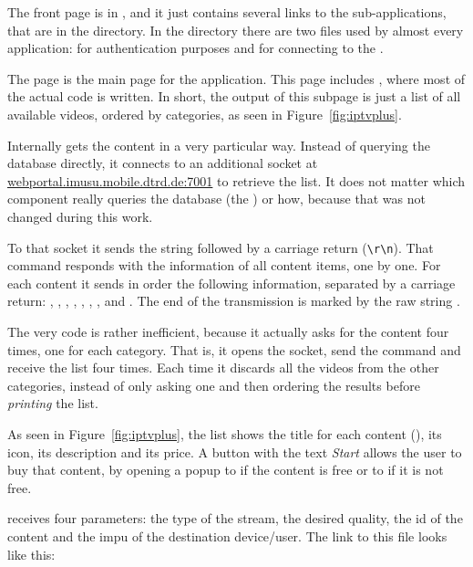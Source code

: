 The front page is in , and it just contains several links to the sub-applications, that are in the  directory.
In the  directory there are two files used by almost every application:  for authentication purposes and  for connecting to the .

The  page is the main page for the  application.
This page includes , where most of the actual code is written.
In short, the output of this subpage is just a list of all available videos, ordered by categories, as seen in Figure~\ref{fig:iptvplus}.

Internally  gets the content in a very particular way.
Instead of querying the database directly, it connects to an additional socket at \url{webportal.imusu.mobile.dtrd.de:7001} to retrieve the list.
It does not matter which component really queries the database (the ) or how, because that was not changed during this work.

To that socket it sends the string  followed by a carriage return (\texttt{\textbackslash{}r\textbackslash{}n}).
That command responds with the information of all content items, one by one.
For each content it sends in order the following information, separated by a carriage return: , , , , , , ,  and .
The end of the transmission is marked by the raw string .

The very  code is rather inefficient, because it actually asks for the content four times, one for each category.
That is, it opens the socket, send the command and receive the list four times.
Each time it discards all the videos from the other categories, instead of only asking one and then ordering the results before \emph{printing} the list.

As seen in Figure~\ref{fig:iptvplus}, the list shows the title for each content (), its icon, its description and its price.
A button with the text \emph{Start} allows the user to buy that content, by opening a popup to  if the content is free or to  if it is not free.

 receives four  parameters: the type of the stream, the desired quality, the id of the content and the impu of the destination device/user.
The link to this  file looks like this:

